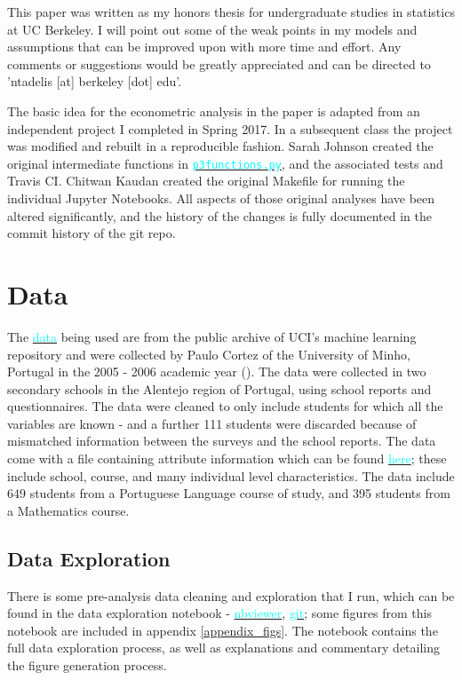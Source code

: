 \documentclass[12pt]{article}
\newcommand{\inlinecode}{\texttt}
\begin{document}
This paper was written as my honors thesis for undergraduate studies in statistics at UC Berkeley. I will point out some of the weak points in my models and assumptions that can be improved upon with more time and effort. Any comments or suggestions would be greatly appreciated and can be directed to 'ntadelis [at] berkeley [dot] edu'. 

The basic idea for the econometric analysis in the paper is adapted from an independent project I completed in Spring 2017. In a subsequent class the project was modified and rebuilt in a reproducible fashion. Sarah Johnson created the original intermediate functions in \href{https://github.com/nadavtadelis/Reproducible_Metrics/blob/master/p3functions.py}{\textcolor{cyan}{\inlinecode{p3functions.py}}}, and the associated tests and Travis CI. Chitwan Kaudan created the original Makefile for running the individual Jupyter Notebooks. All aspects of those original analyses have been altered significantly, and the history of the changes is fully documented in the commit history of the git repo.


\newpage
\section{Data}
The \href{https://archive.ics.uci.edu/ml/datasets/Student+Performance#}{\textcolor{cyan}{data}} being used are from the public archive of UCI's machine learning repository and were collected by Paulo Cortez of the University of Minho, Portugal in the 2005 - 2006 academic year (\cite{data_paper}). The data were collected in two secondary schools in the Alentejo region of Portugal, using school reports and questionnaires. The data were cleaned to only include students for which all the variables are known - and a further 111 students were discarded because of mismatched information between the surveys and the school reports. The data come with a file containing attribute information which can be found \href{https://archive.ics.uci.edu/ml/datasets/Student+Performance#}{\textcolor{cyan}{here}}; these include school, course, and many individual level characteristics. The data include 649 students from a Portuguese Language course of study, and 395 students from a Mathematics course.

\subsection{Data Exploration}
There is some pre-analysis data cleaning and exploration that I run, which can be found in the data exploration notebook - \href{https://nbviewer.jupyter.org/github/nadavtadelis/Reproducible_Metrics/blob/master/data_exploration.ipynb}{\textcolor{cyan}{nbviewer}}, \href{https://github.com/nadavtadelis/Reproducible_Metrics/blob/master/data_exploration.ipynb}{\textcolor{cyan}{git}}; some figures from this notebook are included in appendix \ref{appendix_figs}. The notebook contains the full data exploration process, as well as explanations and commentary detailing the figure generation process.
\end{document}
